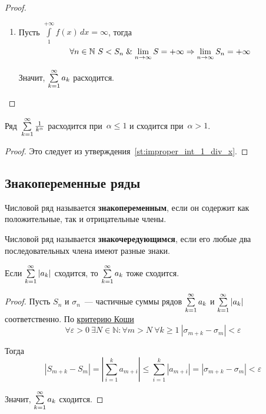 \begin{proof}
\begin{enumerate}
\begin{minipage}[t]{68mm}
\begin{flushright}
	\end{flushright}
	\end{minipage}
	
	\item Пусть $\int\limits_1^{+\infty} f(x)\,dx = \infty$, тогда
	\begin{equation*}
	\forall n \in \mathbb N \ S < S_n \mathrel{\&}
	\lim\limits_{n \to \infty} S = +\infty \Rightarrow
	\lim\limits_{n \to \infty} S_n = +\infty
	\end{equation*}
	
	Значит, $\series a_k$ расходится.
\end{enumerate}
\end{proof}

\begin{consequent}
\label{conseq:series_1_div_k}
Ряд~$\series \frac1{k^\alpha}$ расходится при~$\alpha \leqslant 1$ и сходится при~$\alpha > 1$.
\end{consequent}
\begin{proof}
Это следует из утверждения~\ref{st:improper_int_1_div_x}.
\end{proof}

\subsection{Знакопеременные ряды}
 Числовой ряд называется \textbf{знакопеременным}, если он содержит как положительные, так и отрицательные члены.

 Числовой ряд называется \textbf{знакочередующимся}, если его любые два последовательных члена имеют разные знаки.

\begin{theorem}
Если $\series |a_k|$ сходится, то $\series a_k$ тоже сходится.
\end{theorem}
\begin{proof}
Пусть $S_n$ и $\sigma_n$~--- частичные суммы рядов $\series a_k$ и $\series |a_k|$ соответственно.
По \hyperref[th:Cauchy_criterion]{критерию Коши}
\begin{equation*}
\forall \varepsilon > 0 \
\exists N \in \mathbb N \colon
\forall m > N \ \forall k \geqslant 1 \
|\sigma_{m+k} - \sigma_m| < \varepsilon
\end{equation*}

Тогда
\begin{equation*}
|S_{m+k} - S_m| = |\sum_{i=1}^k a_{m+i}| \leqslant \sum_{i=1}^k |a_{m+i}| = |\sigma_{m+k} - \sigma_m| < \varepsilon
\end{equation*}

Значит, $\series a_k$ сходится.
\end{proof}

